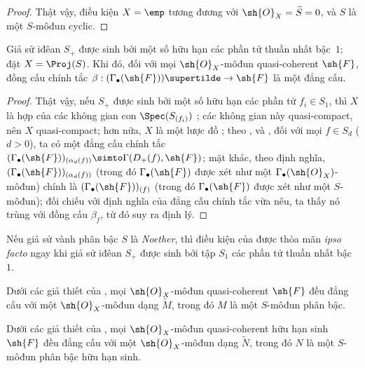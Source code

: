 \documentclass[oneside,10pt]{amsart}
\makeatletter
\newcommand{\ega@arrow}[2]{\mathchoice{#1}{#2}{#2}{#2}}
\renewcommand{\to}{\ega@arrow{\longrightarrow}{\rightarrow}}
\let\EGAOriginalLabel\label
\renewcommand{\label}[1]{\phantomsection\EGAOriginalLabel{#1}}
\makeatother
\begin{document}
\begin{proof}
Thật vậy, điều kiện $X=\emp$ tương đương với $\sh{O}_X=\widetilde{S}=0$, và $S$ là một $S$-môđun cyclic.
\end{proof}

\begin{theorem}[2.7.5]
\label{II.2.7.5}
Giả sử iđêan $S_+$ được sinh bởi một số hữu hạn các phần tử thuần nhất bậc~$1$;
đặt $X=\Proj(S)$.
Khi đó, đối với mọi $\sh{O}_X$-môđun quasi-coherent $\sh{F}$, đồng cấu chính tắc $\beta:(\Gamma_\bullet(\sh{F}))\supertilde\to\sh{F}$  là một đẳng cấu.
\end{theorem}

\begin{proof}
Thật vậy, nếu $S_+$ được sinh bởi một số hữu hạn các phần tử $f_i\in S_1$, thì $X$ là hợp của các không gian con $\Spec(S_{(f_i)})$ ; các không gian này quasi-compact, nên $X$ quasi-compact;
hơn nữa, $X$ là một lược đồ ;
theo ,  và , đối với mọi $f\in S_d$ ($d>0$), ta có một đẳng cấu chính tắc $(\Gamma_\bullet(\sh{F}))_{(\alpha_d(f))}\simto\Gamma(D_+(f),\sh{F})$;
mặt khác, theo định nghĩa, $(\Gamma_\bullet(\sh{F}))_{(\alpha_d(f))}$ (trong đó $\Gamma_\bullet(\sh{F})$ được xét như một $\Gamma_\bullet(\sh{O}_X)$-môđun) chính là $(\Gamma_\bullet(\sh{F}))_{(f)}$ (trong đó $\Gamma_\bullet(\sh{F})$ được xét như một $S$-môđun);
đối chiếu với định nghĩa  của đẳng cấu chính tắc vừa nêu, ta thấy nó trùng với đồng cấu $\beta_f$, từ đó suy ra định lý.
\end{proof}

\begin{remark}[2.7.6]
\label{II.2.7.6}
Nếu giả sử vành phân bậc $S$ là \emph{Noether}, thì điều kiện của  được thỏa mãn \emph{ipso facto} ngay khi giả sử iđêan $S_+$ được sinh bởi tập $S_1$ các phần tử thuần nhất bậc~$1$.
\end{remark}

\begin{corollary}[2.7.7]
\label{II.2.7.7}
Dưới các giả thiết của , mọi $\sh{O}_X$-môđun quasi-coherent $\sh{F}$ đều đẳng cấu với một $\sh{O}_X$-môđun dạng $\widetilde{M}$, trong đó $M$ là một $S$-môđun phân bậc.
\end{corollary}

\begin{corollary}[2.7.8]
\label{II.2.7.8}
Dưới các giả thiết của , mọi $\sh{O}_X$-môđun quasi-coherent hữu hạn sinh $\sh{F}$ đều đẳng cấu với một $\sh{O}_X$-môđun dạng $\widetilde{N}$, trong đó $N$ là một $S$-môđun phân bậc hữu hạn sinh.
\end{corollary}
\end{document}
